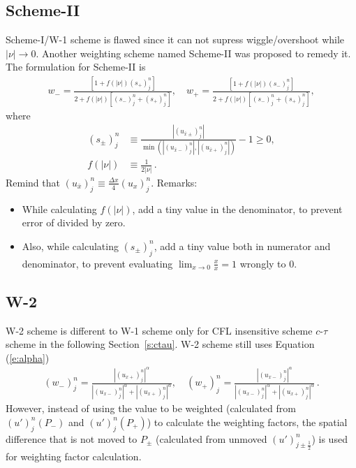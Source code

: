 \documentclass[11pt,dvips]{article}
\numberwithin{equation}{section}
\begin{document}
\subsection{Scheme-II}

Scheme-I/W-1 scheme is flawed since it can not supress wiggle/overshoot
while $|\nu|\rightarrow0$.
Another weighting scheme named Scheme-II was proposed to remedy it.
The formulation for Scheme-II is
\begin{align}
  w_- = \frac{[1+f(|\nu|)(s_+)_j^n]}
             {2 + f(|\nu|)[(s_-)_j^n+(s_+)_j^n]}, \quad
  w_+ = \frac{[1+f(|\nu|)(s_-)_j^n]}
             {2 + f(|\nu|)[(s_-)_j^n+(s_+)_j^n]}, \label{e:Scheme-II}
\end{align}
where
\begin{align}
  (s_{\pm})_j^n &\equiv
    \frac{|(u_{\bar{x}\pm})_j^n|}
         {\min\left(|(u_{\bar{x}-})_j^n|,
                    |(u_{\bar{x}+})_j^n|\right)} - 1
    \ge 0, \label{e:Scheme-IIs} \\
  f(|\nu|) &\equiv
    \frac{1}{2|\nu|}\,. \label{e:Scheme-IIf}
\end{align}
Remind that $(u_{\bar{x}})_j^n\equiv \frac{\Delta x}{4}(u_x)_j^n$.
Remarks:
\begin{itemize}
  \item While calculating $f(|\nu|)$, add a tiny value in the denominator, to
  prevent error of divided by zero.
  \item Also, while calculating $(s_{\pm})_j^n$, add a tiny value both in
  numerator and denominator, to prevent evaluating $\lim_{x\rightarrow0}
  \frac{x}{x} = 1$ wrongly to 0.
\end{itemize}
\citep[See also Equation (3.23), (3.26), (3.27) in][]%
{chang_courant_2002}

\subsection{W-2}

W-2 scheme is different to W-1 scheme only for CFL insensitive scheme
$c$-$\tau$ scheme in the following Section~\ref{s:ctau}.
W-2 scheme still uses Equation (\ref{e:alpha})
\begin{align*}
  (w_-)_j^n =
    \frac{|(u_{x+})_j^n|^{\alpha}}
         {|(u_{x-})_j^n|^{\alpha}+|(u_{x+})_j^n|^{\alpha}}, \quad
  (w_+)_j^n =
    \frac{|(u_{x-})_j^n|^{\alpha}}
         {|(u_{x-})_j^n|^{\alpha}+|(u_{x+})_j^n|^{\alpha}}\,.
\end{align*}
However, instead of using the value to be weighted (calculated from
$(u')_j^n(P_-)$ and $(u')_j^n(P_+)$) to calculate the weighting factors, the
spatial difference that is not moved to $P_{\pm}$ (calculated from unmoved
$(u')_{j\pm\frac{1}{2}}^n$) is used for weighting factor calculation.
\cite[See also section 4.2 in][]{chang_multi-dimensional_2003}
\end{document}

